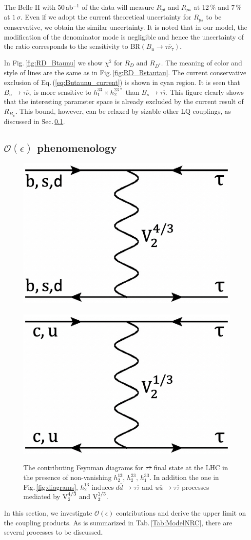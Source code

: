 \documentclass[12pt, a4paper]{article}
\numberwithin{equation}{section} %
\newcommand{\ov}{\overline}
\newcommand{\1}{\mbox{1}\hspace{-0.25em}\mbox{l}}
\begin{document}
The Belle II with 50\,ab$^{-1}$ of the data will measure  $R_{pl}$ and $R_{ps}$ at $12\,\%$ and $7\,\%$ at $1\,\sigma$.
Even if we adopt the current theoretical uncertainty for $R_{ps}$ to be conservative, we obtain the similar uncertainty.
It is noted that in our model, the modification of the denominator mode is negligible and hence the uncertainty of the ratio corresponds to the sensitivity to BR$(B_u\to\tau\ov\nu_\tau)$. 

In Fig.\,\ref{fig:RD_Btaunu} we show $\chi^2$ for $R_{D}$ and $R_{D^*}$.
The meaning of color and style of lines are the same as in Fig.\,\ref{fig:RD_Bstautau}.
The current conservative exclusion of Eq.\,(\ref{eq:Butaunu_current}) is shown in cyan region.
It is seen that $B_u\to\tau\ov\nu_\tau$ is more sensitive to $h_1^{33}\times h_2^{23*}$ than $B_s\to\tau\ov\tau$. 
This figure clearly shows that the interesting parameter space is already excluded by the current result of $R_{B_u}$. 
This bound, however, can be relaxed by sizable other LQ couplings, as discussed in Sec.\,\ref{sec:Oepsilon}. 


\subsection{$\mathcal{O} (\epsilon)$ phenomenology}
\label{sec:Oepsilon}
\begin{figure}[t]
\begin{center}
 \includegraphics[width=0.3 \textwidth]{Figs/dia_LHC_4o3_v2.pdf}~~~~~~~~~~
  \includegraphics[width=0.3 \textwidth]{Figs/dia_LHC_1o3_v2.pdf}
\end{center}
 \caption{
  \label{fig:diagrams2}
  The contributing Feynman diagrams for $\tau\ov\tau$ final state at the LHC in the presence of non-vanishing $h_2^{13}$, $h_2^{23}$, $h_1^{33}$.
  In addition the one in Fig.\,\ref{fig:diagrams}, $h_2^{13}$ induces $d \ov d\to \tau \ov\tau$ and $u\ov u\to \tau\ov\tau$ processes mediated by $\rm{V}^{4/3}_2$ and $\rm{V}^{1/3}_2$.
 }
\end{figure}
In this section, we investigate $\mathcal{O} (\epsilon)$ contributions and derive the upper limit on the coupling products.
As is summarized in Tab.\,\ref{Tab:ModelNRC}, there are several processes to be discussed.
\end{document}
